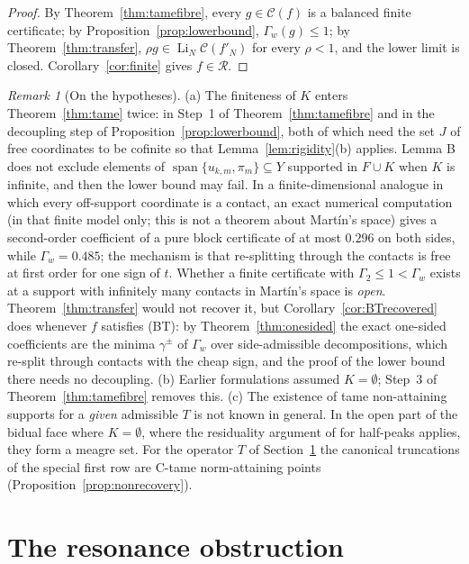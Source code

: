 \documentclass[10pt]{amsart}
\theoremstyle{definition}
\theoremstyle{remark}
\newtheorem{remark}[theorem]{Remark}
\newcommand{\spn}{\operatorname{span}}
\newcommand{\Cset}{\mathcal C}
\newcommand{\Li}{\operatorname*{Li}}
\newcommand{\Rec}{\mathcal R}
\begin{document}
\begin{proof}
By Theorem~\ref{thm:tamefibre}, every $g\in\Cset(f)$ is a balanced finite
certificate; by Proposition~\ref{prop:lowerbound}, $\Gamma_w(g)\le1$; by
Theorem~\ref{thm:transfer}, $\rho g\in\Li_N\Cset(f'_N)$ for every $\rho<1$,
and the lower limit is closed.  Corollary~\ref{cor:finite} gives $f\in\Rec$.
\end{proof}

\begin{remark}[On the hypotheses]\label{rem:kinks}
(a) The finiteness of $K$ enters Theorem~\ref{thm:tame} twice: in Step~1 of
Theorem~\ref{thm:tamefibre} and in the decoupling step of
Proposition~\ref{prop:lowerbound}, both of which need the set $J$ of free
coordinates to be cofinite so that Lemma~\ref{lem:rigidity}(b) applies.
Lemma B does not exclude elements of $\spn\{u_{k,m},\pi_m\}\subseteq Y$
supported in $F\cup K$ when $K$ is infinite, and then the lower bound may
fail.  In a finite-dimensional analogue in which every off-support
coordinate is a contact, an exact numerical computation (in that finite
model only; this is not a theorem about Mart\'in's space) gives a
second-order coefficient of a pure block certificate of at most $0.296$ on
both sides, while $\Gamma_w=0.485$; the mechanism is that re-splitting
through the contacts is free at first order for one sign of $t$.  Whether a finite certificate with $\Gamma_2\le1<\Gamma_w$ exists at a
support with infinitely many contacts in Mart\'in's space is \emph{open}.
Theorem~\ref{thm:transfer} would not recover it, but
Corollary~\ref{cor:BTrecovered} does whenever $f$ satisfies \textup{(BT)}:
by Theorem~\ref{thm:onesided} the exact one-sided coefficients are the
minima $\gamma^\pm$ of $\Gamma_w$ over side-admissible decompositions, which
re-split through contacts with the cheap sign, and the proof of the lower
bound there needs no decoupling.  (b) Earlier formulations
assumed $K=\emptyset$; Step~3 of Theorem~\ref{thm:tamefibre} removes this.
(c) The existence of tame non-attaining supports for a \emph{given}
admissible $T$ is not known in general.  In the open part of the bidual
face where $K=\emptyset$, where the residuality argument of
\cite[Section~3]{PrA} for half-peaks applies, they form a meagre set.
For the operator $T$ of Section~\ref{sec:resonance} the canonical
truncations of the special first row are C-tame norm-attaining points
(Proposition~\ref{prop:nonrecovery}).
\end{remark}

\section{The resonance obstruction}\label{sec:resonance}
\end{document}
